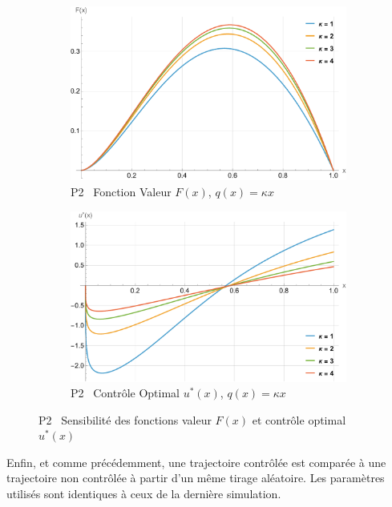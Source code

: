 \begin{figure}[htb]
    \begin{subfigure}{0.45\linewidth}
        \includegraphics[width=\linewidth]{img/validation/P2/p2_K_value.pdf}
        \caption{P2 \textemdash~Fonction Valeur $F(x)$, $q(x)=\kappa x$}\label{fig:KappaValueVisualisation2}
    \end{subfigure}
    \hfill
    \begin{subfigure}{0.45\linewidth}
        \includegraphics[width=\linewidth]{img/validation/P2/p2_K_control.pdf}
        \caption{P2 \textemdash~Contrôle Optimal $u^*(x)$, $q(x)=\kappa x$}\label{fig:KappaControlVisualisation2}
    \end{subfigure}

    \caption{P2 \textemdash~Sensibilité des fonctions valeur $F(x)$ et contrôle optimal $u^*(x)$}\label{fig:ParamSensitivityP2}
\end{figure}
\FloatBarrier Enfin, et comme précédemment, une trajectoire contrôlée est comparée à une trajectoire non contrôlée à partir d'un même tirage aléatoire. Les paramètres utilisés sont identiques à ceux de la dernière simulation.
